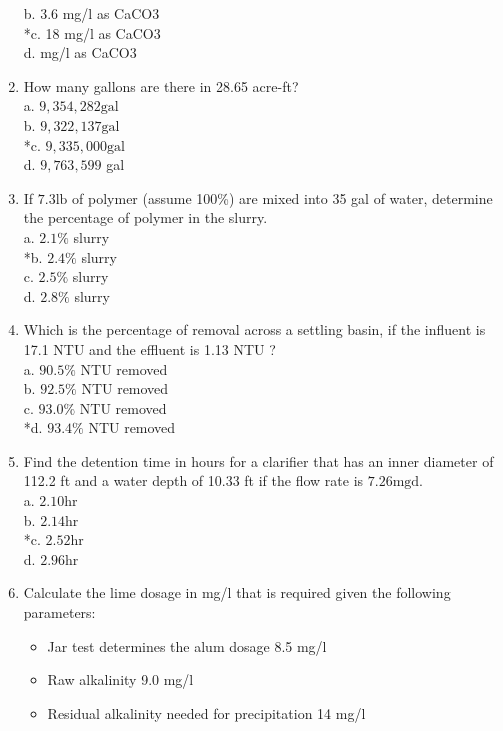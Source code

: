 \begin{enumerate}
b. 3.6 mg/l as CaCO3\\
*c. 18 mg/l as CaCO3\\
d. mg/l as CaCO3\\
  \item How many gallons are there in 28.65 acre-ft?\\
a. $9,354,282 \mathrm{gal}$\\
b. $9,322,137 \mathrm{gal}$\\
*c. $9,335,000 \mathrm{gal}$\\
d. $9,763,599$ gal\\
  \item If $7.3 \mathrm{lb}$ of polymer (assume 100\%) are mixed into 35 gal of water, determine the percentage of polymer in the slurry.\\
a. $2.1 \%$ slurry\\
*b. $2.4 \%$ slurry\\
c. $2.5 \%$ slurry\\
d. $2.8 \%$ slurry\\
  \item Which is the percentage of removal across a settling basin, if the influent is 17.1 NTU and the effluent is 1.13 NTU ?\\
a. $90.5 \%$ NTU removed\\
b. $92.5 \%$ NTU removed\\
c. $93.0 \%$ NTU removed\\
*d. $93.4 \%$ NTU removed\\
  \item Find the detention time in hours for a clarifier that has an inner diameter of 112.2 ft and a water depth of 10.33 ft if the flow rate is $7.26 \mathrm{mgd}$.\\
a. $2.10 \mathrm{hr}$\\
b. $2.14 \mathrm{hr}$\\
*c. $2.52 \mathrm{hr}$\\
d. $2.96 \mathrm{hr}$ \\
\item Calculate the lime dosage in mg/l that is required given the following parameters:\\
\begin{itemize}
  \item Jar test determines the alum dosage 8.5 mg/l\\
  \item Raw alkalinity 9.0 mg/l\\
  \item Residual alkalinity needed for precipitation 14 mg/l\\

\end{itemize}
\end{enumerate}
